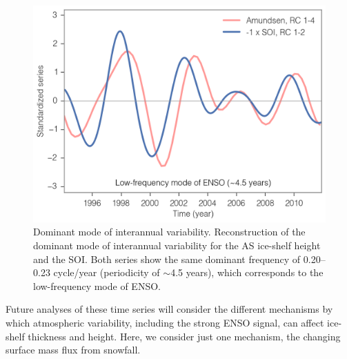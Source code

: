 \begin{figure}[!ht]
  \centering
  \includegraphics[width=.72\textwidth]{img/amu_soi_modes.png}
  \caption[Dominant mode of interannual variability (10 RCs)]{
  Dominant mode of interannual variability. Reconstruction of the dominant mode of interannual variability for the AS ice-shelf height and the SOI. Both series show the same dominant frequency of 0.20--0.23 cycle/year (periodicity of $\sim$4.5 years), which corresponds to the low-frequency mode of ENSO.
  }
  \label{c4f9}
\end{figure}


Future analyses of these time series will consider the different mechanisms by which atmospheric variability, including the strong ENSO signal, can affect ice-shelf thickness and height. Here, we consider just one mechanism, the changing surface mass flux from snowfall.


